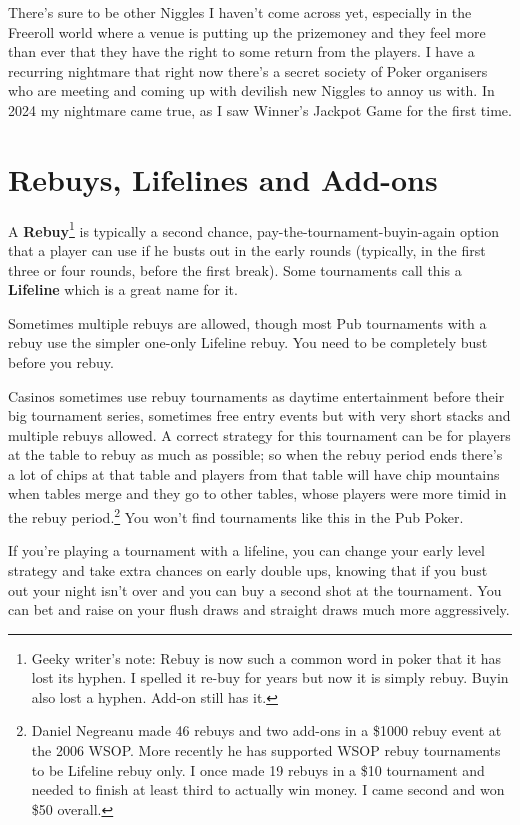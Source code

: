There's sure to be other Niggles I haven't come across yet,
especially in the Freeroll world where a venue is putting up the
prizemoney and they feel more than ever that they have the right
to some return from the players. I have a recurring
nightmare that right now there's a secret society of Poker organisers
who are meeting and coming up with devilish new Niggles to annoy us with.
In 2024 my nightmare came true, as I saw Winner's Jackpot Game for
the first time.

\section{Rebuys, Lifelines and Add-ons}

A \textbf{Rebuy}\footnote{Geeky writer's note: Rebuy is now such a
  common word in poker that it has lost its hyphen. I spelled it
  re-buy for years but now it is simply rebuy. Buyin also lost a
  hyphen. Add-on still has it.}
is typically a second chance, pay-the-tournament-buyin-again
option that a player can use if he busts out in the early rounds
(typically, in the first three or four rounds, before the first
break). Some tournaments call this a \textbf{Lifeline} which is a
great name for it.

Sometimes multiple rebuys are allowed, though most Pub tournaments
with a rebuy use the simpler one-only Lifeline rebuy. You
need to be completely bust before you rebuy.

Casinos sometimes use rebuy tournaments as daytime entertainment
before their big tournament series, sometimes free entry events
but with very short stacks and multiple rebuys allowed. A correct
strategy for this tournament can be for players at the table
to rebuy as much as possible; so when the rebuy period ends there's
a lot of chips at that table and players from that table will
have chip mountains when tables merge and they go to
other tables, whose players were more timid in the rebuy
period.\footnote{Daniel Negreanu made 46 rebuys and two add-ons
  in a \$1000 rebuy event at the 2006 WSOP. More recently he has
  supported WSOP rebuy tournaments to be Lifeline rebuy only. I once
  made 19 rebuys in a \$10 tournament and needed to finish at least
  third to actually win money. I came second and won \$50 overall.} You
won't find tournaments like this in the Pub Poker.

If you're playing a tournament with a lifeline, you can change
your early level strategy and take extra chances on early
double ups, knowing that if you bust out your night isn't over and
you can buy a second shot at the tournament. You can bet and raise
on your flush draws and straight draws much more aggressively.

